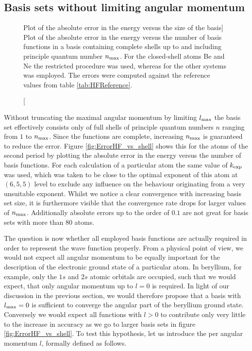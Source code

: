 %
%
\subsection{Basis sets without limiting angular momentum}
\begin{figure}
	\centering
	\caption
	[Plot of the absolute error in the \HF energy versus the size of the \CS basis]
	{
		Plot of the absolute error in the \HF energy versus the number of basis
		functions in a \CS basis containing complete shells
		up to and including principle quantum number $n_\text{max}$.
		For the closed-shell atoms Be and Ne
		the restricted \HF procedure was used,
		whereas for the other systems \UHF was employed.
		The errors were computed against the reference
		values from table \vref{tab:HFReference}.
}
	\label{fig:ErrorHF_vs_shell}
\end{figure}
Without truncating the maximal angular momentum by limiting $l_\text{max}$
the \CS basis set effectively consists only of full shells
of principle quantum numbers $n$ ranging from $1$ to $n_\text{max}$.
Since the \CS functions are complete, increasing $n_\text{max}$ is guaranteed
to reduce the error.
Figure \vref{fig:ErrorHF_vs_shell} shows this for the atoms of the second period
by plotting the absolute error in the \HF energy
versus the number of basis functions.
For each calculation of a particular atom the same value of $k_\text{exp}$ was used,
which was taken to be close to the optimal exponent of this atom at $(6,5,5)$ level
to exclude any influence on the behaviour originating from a
very unsuitable exponent.
Whilst we notice a clear convergence with increasing basis set size,
it is furthermore visible that the convergence rate drops
for larger values of $n_\text{max}$.
Additionally absolute errors up to the order of $0.1$ are not great
for basis sets with more than $80$ atoms.

The question is now whether all employed
basis functions are actually required
in order to represent the \HF wave function properly.
From a physical point of view,
we would not expect all angular momentum to be equally important
for the description of the electronic ground state of a particular atom.
In beryllium, for example, only the $1s$ and $2s$ atomic orbitals are occupied,
such that we would expect, that only angular momentum up to $l = 0$ is required.
In light of our discussion in the previous section,
we would therefore propose that a basis with $l_\text{max} = 0$ is sufficient
to converge the angular part of the beryllium ground state.
Conversely we would expect all \CS functions with $l > 0$
to contribute only very little to the increase in accuracy
as we go to larger basis sets in figure \vref{fig:ErrorHF_vs_shell}.
To test this hypothesis, let us introduce the
 per angular momentum $l$,
formally defined as follows.

